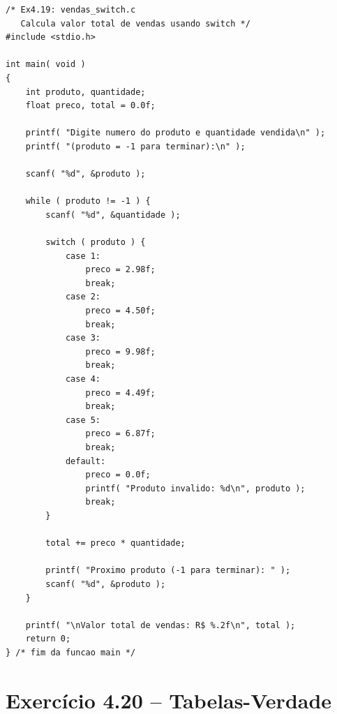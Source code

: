 \documentclass[12pt,a4paper]{article}
\begin{document}
\begin{respostabox}
\begin{lstlisting}
/* Ex4.19: vendas_switch.c
   Calcula valor total de vendas usando switch */
#include <stdio.h>

int main( void )
{
    int produto, quantidade;
    float preco, total = 0.0f;

    printf( "Digite numero do produto e quantidade vendida\n" );
    printf( "(produto = -1 para terminar):\n" );

    scanf( "%d", &produto );

    while ( produto != -1 ) {
        scanf( "%d", &quantidade );

        switch ( produto ) {
            case 1:
                preco = 2.98f;
                break;
            case 2:
                preco = 4.50f;
                break;
            case 3:
                preco = 9.98f;
                break;
            case 4:
                preco = 4.49f;
                break;
            case 5:
                preco = 6.87f;
                break;
            default:
                preco = 0.0f;
                printf( "Produto invalido: %d\n", produto );
                break;
        }

        total += preco * quantidade;

        printf( "Proximo produto (-1 para terminar): " );
        scanf( "%d", &produto );
    }

    printf( "\nValor total de vendas: R$ %.2f\n", total );
    return 0;
} /* fim da funcao main */
\end{lstlisting}
\end{respostabox}

\newpage

\section{Exercício 4.20 -- Tabelas-Verdade}
\end{document}
